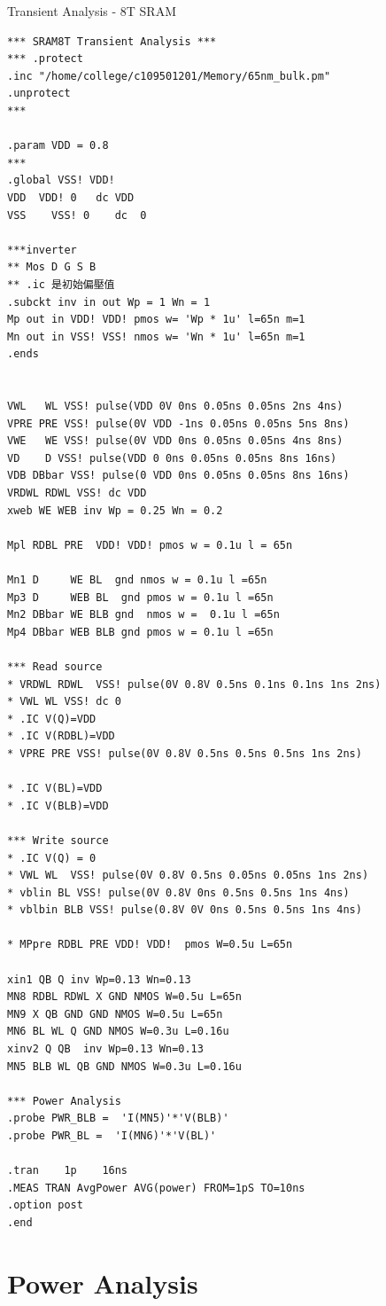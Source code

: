 \documentclass[a4paper]{article}
\newenvironment{code}{\captionsetup{type=listing, font=large, name=List.}}{}
\begin{document}
\begin{code}
\caption{Transient Analysis - 8T SRAM}
\begin{verbatim}
*** SRAM8T Transient Analysis ***
*** .protect
.inc "/home/college/c109501201/Memory/65nm_bulk.pm"
.unprotect
*** 

.param VDD = 0.8
***
.global VSS! VDD!
VDD  VDD! 0   dc VDD
VSS    VSS! 0    dc  0

***inverter
** Mos D G S B
** .ic 是初始偏壓值
.subckt inv in out Wp = 1 Wn = 1
Mp out in VDD! VDD! pmos w= 'Wp * 1u' l=65n m=1
Mn out in VSS! VSS! nmos w= 'Wn * 1u' l=65n m=1
.ends


VWL   WL VSS! pulse(VDD 0V 0ns 0.05ns 0.05ns 2ns 4ns)
VPRE PRE VSS! pulse(0V VDD -1ns 0.05ns 0.05ns 5ns 8ns)
VWE   WE VSS! pulse(0V VDD 0ns 0.05ns 0.05ns 4ns 8ns)
VD    D VSS! pulse(VDD 0 0ns 0.05ns 0.05ns 8ns 16ns)
VDB DBbar VSS! pulse(0 VDD 0ns 0.05ns 0.05ns 8ns 16ns)
VRDWL RDWL VSS! dc VDD
xweb WE WEB inv Wp = 0.25 Wn = 0.2

Mpl RDBL PRE  VDD! VDD! pmos w = 0.1u l = 65n

Mn1 D     WE BL  gnd nmos w = 0.1u l =65n
Mp3 D     WEB BL  gnd pmos w = 0.1u l =65n
Mn2 DBbar WE BLB gnd  nmos w =  0.1u l =65n
Mp4 DBbar WEB BLB gnd pmos w = 0.1u l =65n

*** Read source
* VRDWL RDWL  VSS! pulse(0V 0.8V 0.5ns 0.1ns 0.1ns 1ns 2ns)
* VWL WL VSS! dc 0
* .IC V(Q)=VDD
* .IC V(RDBL)=VDD
* VPRE PRE VSS! pulse(0V 0.8V 0.5ns 0.5ns 0.5ns 1ns 2ns)

* .IC V(BL)=VDD
* .IC V(BLB)=VDD

*** Write source
* .IC V(Q) = 0
* VWL WL  VSS! pulse(0V 0.8V 0.5ns 0.05ns 0.05ns 1ns 2ns)
* vblin BL VSS! pulse(0V 0.8V 0ns 0.5ns 0.5ns 1ns 4ns)
* vblbin BLB VSS! pulse(0.8V 0V 0ns 0.5ns 0.5ns 1ns 4ns)

* MPpre RDBL PRE VDD! VDD!  pmos W=0.5u L=65n

xin1 QB Q inv Wp=0.13 Wn=0.13
MN8 RDBL RDWL X GND NMOS W=0.5u L=65n
MN9 X QB GND GND NMOS W=0.5u L=65n
MN6 BL WL Q GND NMOS W=0.3u L=0.16u
xinv2 Q QB  inv Wp=0.13 Wn=0.13
MN5 BLB WL QB GND NMOS W=0.3u L=0.16u

*** Power Analysis
.probe PWR_BLB =  'I(MN5)'*'V(BLB)'
.probe PWR_BL =  'I(MN6)'*'V(BL)'

.tran    1p    16ns 
.MEAS TRAN AvgPower AVG(power) FROM=1pS TO=10ns
.option post
.end  
\end{verbatim}
\end{code}

\section{Power Analysis}
\end{document}
